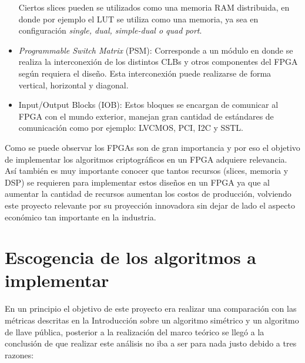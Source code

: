 \begin{itemize}
Ciertos slices pueden se utilizados como una memoria RAM distribuida, en donde por ejemplo el LUT se utiliza como una memoria, ya sea en configuración \textit{single, dual, simple-dual o quad port}. 

\item \textit{Programmable Switch Matrix} (PSM): Corresponde a un módulo en donde se realiza la interconexión de los distintos CLBs y otros componentes del FPGA según requiera el diseño. Esta interconexión puede realizarse de forma vertical, horizontal y diagonal.


\item Input/Output Blocks (IOB): Estos bloques se encargan de comunicar al FPGA con el mundo exterior, manejan gran cantidad de estándares de comunicación como por ejemplo: LVCMOS, PCI, I2C y SSTL.
\end{itemize}


Como se puede observar los FPGAs son de gran importancia y por eso el objetivo de implementar los algoritmos criptográficos en un FPGA adquiere relevancia. Así también es muy importante conocer que tantos recursos (slices, memoria y DSP) se requieren para implementar estos diseños en un FPGA ya que al aumentar la cantidad de recursos aumentan los costos de producción, volviendo este proyecto relevante por su proyección innovadora sin dejar de lado el aspecto económico tan importante en la industria. 






\section{Escogencia de los algoritmos a implementar}
En un principio el objetivo de este proyecto era realizar una comparación con las métricas descritas en la Introducción sobre un algoritmo simétrico y un algoritmo de llave pública, posterior a la realización del marco teórico se llegó a la conclusión de que realizar este análisis no iba a ser para nada justo debido a tres razones:

